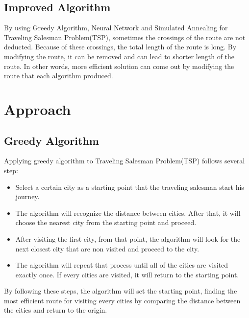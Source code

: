 \documentclass[12pt]{article}
\begin{document}
\subsection*{Improved Algorithm}
By using Greedy Algorithm, Neural Network and Simulated Annealing for Traveling Salesman Problem(TSP), sometimes the crossings of the route are not deducted. Because of these crossings, the total length of the route is long. By modifying the route, it can be removed and can lead to shorter length of the route. In other words, more efficient solution can come out by modifying the route that each algorithm produced. 
\section{Approach}
\subsection*{Greedy Algorithm}
\noindent Applying greedy algorithm to Traveling Salesman Problem(TSP) follows several step: 
\begin{itemize}
\item Select a certain city as a starting point that the traveling salesman start his journey.
\item The algorithm will recognize the distance between cities. After that, it will choose the nearest city from the starting point and proceed. 
\item After visiting the first city, from that point, the algorithm will look for the next closest city that are non visited and proceed to the city.
\item The algorithm will repeat that process until all of the cities are visited exactly once. If every cities are visited, it will return to the starting point.
\end{itemize}
By following these steps, the algorithm will set the starting point, finding the most efficient route for visiting every cities by comparing the distance between the cities and return to the origin. 
\end{document}
